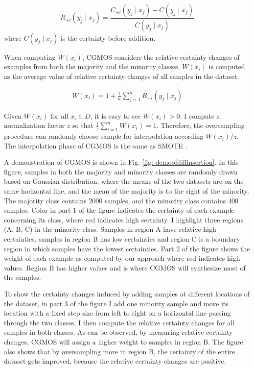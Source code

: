 \documentclass{iitthesis}
\begin{document}
\begin{equation}
R_{+i}(y_j \mid x_j)= \frac{C_{+i}(y_j \mid x_j) -C(y_j \mid x_j)}{C(y_j \mid x_j)}
\label{eqn: relative diff}
\end{equation}
where $C(y_j \mid x_j)$ is the certainty before addition.

When computing $W(x_i)$, CGMOS considers the relative certainty changes of examples from both the majority and the minority classes. $W(x_i)$ is computed as the average value of relative certainty changes of all samples in the dataset.

\begin{equation}
\begin{split}
W(x_i)= 1+\frac{1}{n}\sum_{j=1}^n R_{+i}(y_j \mid x_j)
\end{split} 
\label{eqn: weight}
\end{equation}

Given $W(x_i)$ for all $x_i \in D$, it is easy to see $W(x_i)>0$. I compute a normalization factor $z$ so that $\frac{1}{z}\sum_{i=1}^n W(x_i)=1$. Therefore, the oversampling procedure can randomly choose sample for interpolation according $W(x_i)/z$. The interpolation phase of CGMOS is  the same as SMOTE \cite{CNV:02}. 

A demonstration of CGMOS is shown in Fig. \ref{fig: demoofdiffinsertion}. In this figure, samples in both the majority and minority classes are randomly drawn based on Gaussian distribution, where the means of the two datasets are on the same horizontal line, and the mean of the majority is to the right of the minority. The majority class contains 2000 samples, and the minority class contains 400 samples. Color in part 1 of the figure indicates the certainty of each example concerning its class, where red indicates high certainty. I highlight three regions (A, B, C) in the minority class. Samples in region A have relative high certainties, samples in region B has low certainties and region C is a boundary region in which samples have the lowest certainties. Part 2 of the figure shows the weight of each example as computed by our approach where red indicates high values. Region B has higher values and is where CGMOS will synthesize most of the samples.

To show the certainty changes induced by adding samples at different locations of the dataset, in part 3 of the figure I add one minority sample and move its location with a fixed step size from left to right on a horizontal line passing through the two classes. I then compute the relative certainty changes for all samples in both classes. As can be observed, by measuring relative certainty changes, CGMOS will assign a higher weight to samples in region B. The figure also shows that by oversampling more in region B, the certainty of the entire dataset gets improved, because the relative certainty changes are positive.
\end{document}
